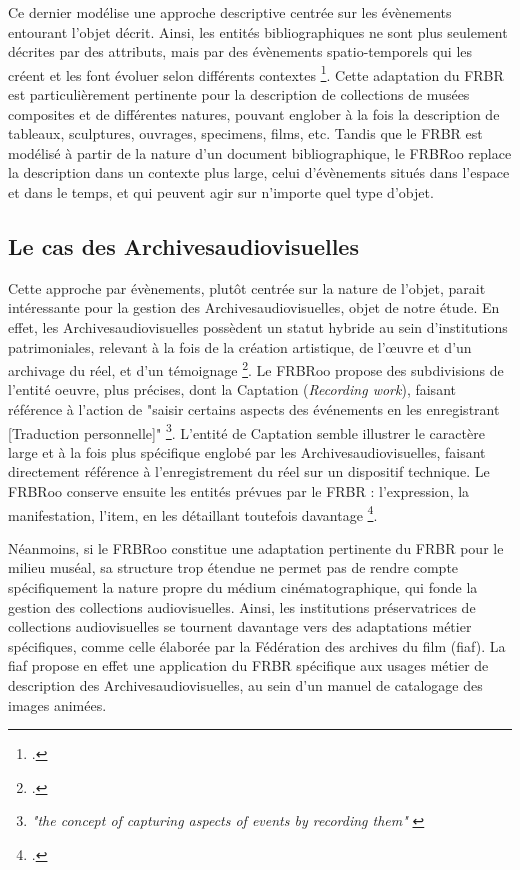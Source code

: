 Ce dernier modélise une approche descriptive centrée sur les évènements entourant l’objet décrit. Ainsi, les entités bibliographiques ne sont plus seulement décrites par des attributs, mais par des évènements spatio-temporels qui les créent et les font évoluer selon différents contextes \footcite{dialogue2017}. Cette adaptation du \gls{FRBR} est particulièrement pertinente pour la description de collections de musées composites et de différentes natures, pouvant englober à la fois la description de tableaux, sculptures, ouvrages, specimens, films, etc. Tandis que le \gls{FRBR} est modélisé à partir de la nature d’un document bibliographique, le FRBRoo replace la description dans un contexte plus large, celui d’évènements situés dans l’espace et dans le temps, et qui peuvent agir sur n’importe quel type d’objet.  

\subsection{Le cas des \gls{Archivesaudiovisuelles}}
Cette approche par évènements, plutôt centrée sur la nature de l'objet, parait intéressante pour la gestion des \gls{Archivesaudiovisuelles}, objet de notre étude. En effet, les \gls{Archivesaudiovisuelles} possèdent un statut hybride au sein d’institutions patrimoniales, relevant à la fois de la création artistique, de l’œuvre et d’un archivage du réel, et d’un témoignage \footcite{zotero-item-669}. Le \gls{FRBRoo} propose des subdivisions de l'entité \gls{oeuvre}, plus précises, dont la Captation (\textit{Recording work}), faisant référence à l'action de "saisir certains aspects des événements en les enregistrant [Traduction personnelle]" \footnote{\textit{"the concept of capturing aspects of events by recording them"} \cite{zotero-item-816}}. L'entité de Captation semble illustrer le caractère large et à la fois plus spécifique englobé par les \gls{Archivesaudiovisuelles}, faisant directement référence à l'enregistrement du réel sur un dispositif technique. Le \gls{FRBRoo} conserve ensuite les entités prévues par le \gls{FRBR} : l’\gls{expression}, la \gls{manifestation}, l’\gls{item}, en les détaillant toutefois davantage \footcite{zotero-item-816}.

Néanmoins, si le \gls{FRBRoo} constitue une adaptation pertinente du \gls{FRBR} pour le milieu muséal, sa structure trop étendue ne permet pas de rendre compte spécifiquement la nature propre du médium cinématographique, qui fonde la gestion des collections audiovisuelles. Ainsi, les institutions préservatrices de collections audiovisuelles se tournent davantage vers des adaptations métier spécifiques, comme celle élaborée par la Fédération des archives du film (\gls{fiaf}). La \gls{fiaf} propose en effet une application du \gls{FRBR} spécifique aux usages métier de description des \gls{Archivesaudiovisuelles}, au sein d’un manuel de catalogage des images animées. 
